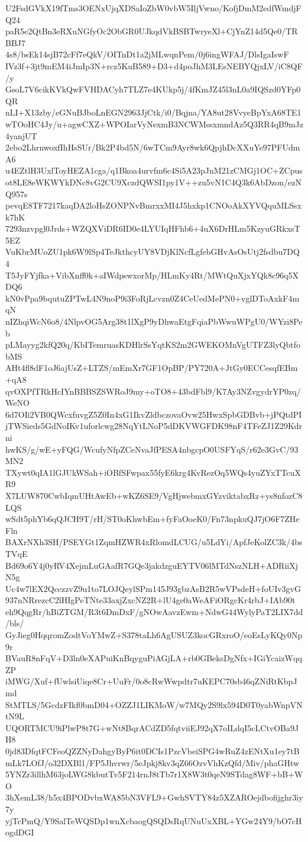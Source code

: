 U2FsdGVkX19fTms3OENxUjqXDSaIoZbW0vbW5IljVwno/KofjDmM2edfWmdjFQ24
paR5e2QtBn3eRXuNGfyOc2ObGR0UJkqdVkBSBTwryeXl+CjYnZ14d5Qe0/TRBBJ7
4s8/bsEk14sjB72cFf7eQkV/OITnDt1a2jMLwqnPem/0j6ingWFAJ/DlsIgaIswF
IVz3f+3jt9mEM4iJmIp3N+rcz5KuB589+D3+d4poJhM3LEsNEBYQjxLV/iC8QF/y
GsoL7V6cikKVkQwFVHDACyh7TLZ7e4KUkp5j/4fKmJZ45l3nL0a9IQSzd0YFp0QR
nLI+X13zby/eGNuBJboLnEGN2963JjCtk/i0/Bqjna/YA8ut28VvyeBpYxA68TE1
wTOoHC4Jy/u+agwCXZ+WPOIarVyNexmB3NCWMssxmndAz5Q3RR4qB9mJz4yanjUT
2ebo2LhrnwoxfIhHsSUr/Bk2P4bd5N/6wTCm9Ayr8wk6QpjhDcXXuYe97PFUdmA6
u4EZtlH3UxlToyHEZA1cga/q1Bkoa4urvfm6c4Si5A23pJnM21zCMGj1OC+ZCpus
ot8LE8eWKWYkDNc8vG2CU9XczdQWSI1py1V++zu5vN1C4Q3k6AbDzon/ezNQ957s
pevqE8TF7217kaqDA2loHsZONPNvBmrxxMI4J5hxkp1CNOoAkXYVQquMLSsxk7hK
7293nzvpgl0Jrds+WZQXViDR6ID0e4LYUIqHFhb6+4uX6DrHLm5KzyuGRkxsT5EZ
VuKbrMUoZU1pk6W9lSp4TeJkthcyUY8VDjKlNcfLgfebGHvAsOsUtj2fsdbu7DQ4
T5JyFYjfka+VibXnff0k+aIWdpswxorMp/HLmKy4Rt/MWtQuXjxYQk8c96q5XDQ6
kN0vPpa9bqutuZPTwL4N9noP9i3FoRjLcvzn0Z4CeUedMePN0+vglDToAxkF4mqN
nIZhqiWcN6o8/4NlpvOG5Arg38t1lXgP9yDhwaEtgFqiaPbWwuWPgU0/WYzi8Peb
pLMayyg2kfQ20q/KbITemruasKDHlrSsYqtKS2m2GWEKOMnVgUTFZ3lyQbtfobMS
AHt4fl8dF1oJ6ajUsZ+LTZS/mEmXr7GF1OpBP/PY720A+JtGy0ECCesqfEBm+qA8
qvOXPfTRkHcIYnBBBSZSWRoJ9my+oTO8+43bdFbl9/K7Ay3NZvgydrYP0zq/WeNO
6d7OIi2VB0QWcxfuvgZ5Z0In4xG1IkvZldbczovaOvw25HwxSpbGDBvb+jPQtdPI
jTWSieds5GdNoIKv1uforlcwg28NqYtLNoP5dDKVWGFDK98nF4TFeZJ1Z29Kdrni
hwKS/g/wE+yFQG/WcufyNfpZCeNvaJfPESA4nbgcpO0USFYqS/r62e3GvC/93MN2
TXywt0qIA1lGJUkWSah+iOBfSFwpax55fyE6krg4KvRezOq5WQs4yuZYxTTcuXR9
X7LUW870CwbIqmUHtAwEb+wKZ6SE9/VgHjwebmxGYzviktabxRz+ys8nfozC8LQS
wSdt5phYb6qQJCH9T/rH/ST0oKhwbEm+fyFaOoeK0/Fn73npkuQJ7jO6F7ZHeFln
BAXrNXh3SH/PSEYGt1ZqmHZWR4xRlomdLCUG/u5LdYi/ApfJeKolZC3k/4bsTVqE
Bd69o6Y4j0yRV4XejmLuGAafR7GQe3jakdzguEYTV06lMTdNszNLH+ADRiiXjN5g
Uc4w7lEX2QcczzvZ9u1to7LOJQeylSPm145J93gbzAsB2R5wVPsdeH+foUIv3gvG
937nNRrezcC2lHIgPeTNte33axjZxcNZ2R+lU4ge0aWeAFiORgcKr4rbJ+IAb90t
eh9QqgRr/hBiZTGM/R3t6DmDxF/gNOwAavzEwm+NdwG44WylyPaT2LIX7dd/bls/
GyJieg0HqqromZodtVoYMwZ+S378taLh6AgUSUZ3kocGRxroO/eoEsLyKQy0Np9r
BVauR8nFqV+D3ln0eXAPuiKnBqyguPiAGjLA+rb0GBeksDgNfx+IGiYcaizWqqZP
iMWG/Xuf+fUwlsiUiqe8Cr+UuFr/0o8cRwWwpdtr7uKEPC70sb46qZNiRtKbpJmd
StMTLS/5GcdzFIkf0bmD04+OZZJ1LIKMoW/w7MQy2S9lx594D0T0yabWnpVNtN9L
UQORTMCU9iPlwP8t7G+wNt8BqrACdZD5fqtviiEJ92qX7oILdqI5cLCtvOBa9JH8
0jd83DfqtFCFeoQZZNyDahgyByP6it0DCIs1PzcVbeiSPG4wRuZ4zENtXu1ey7tB
mLk7LOfJ/o32DXBl1/FP5Jhvrwr/5eJpkj8kv3qZ66OzvVhKzQfd/Miv/phaGHtw
5YNZr3illhM63joLWG8kbutTv5F214rnJ8tTb7r1X8W3t0qeN9STdag8WF+bB+WO
3hXemL38/h5x4BPODvbxWA85bN3VFL9+GwhSVTY84z5XZAROejdbofijghr3iy7y
yjTcPmQ/Y9SalTeWQSDp1wnXcbaogQSQDsRqUNuUxXBL+YGw24Y9/bO7cHogdDGI
